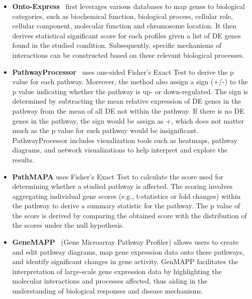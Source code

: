 \begin{itemize}
\item \textbf{Onto-Express}~\cite{Khatri:2002, DraghiciOE2:2003} first leverages various databases to map genes to biological categories, such as biochemical function, biological process, cellular role, cellular component, molecular function and chromosome location. It then derives statistical significant score for each profiles given a list of DE genes found in the studied condition. Subsequently, specific mechanisms of interactions can be constructed based on these relevant biological processes.

\item \textbf{PathwayProcessor}~\cite{Grosu:2002} uses one-sided Fisher's Exact Test to derive the p value for each pathway. Moreover, the method also assign a sign (+/-) to the p value indicating whether the pathway is up- or down-regulated. The sign is determined by subtracting the mean relative expression of DE genes in the pathway from the mean of all DE not within the pathway. If there is no DE genes in the pathway, the sign would be assign as +, which does not matter much as the p value for such pathway would be insignificant. PathwayProcessor includes visualization tools such as heatmaps, pathway diagrams, and network visualizations to help interpret and explore the results.

\item \textbf{PathMAPA} \cite{Pan:2003} uses Fisher's Exact Test to calculate the score used for determining whether a studied pathway is affected. The scoring  involves aggregating individual gene scores (e.g., t-statistics or fold changes) within the pathway to derive a summary statistic for the pathway. The p value of the score is derived by comparing the obtained score with the distribution of the scores under the null hypothesis. 


%
%

\item \textbf{GeneMAPP}~\cite{Dahlquist:2002} (Gene Microarray Pathway Profiler) allows users to create and edit pathway diagrams, map gene expression data onto these pathways, and identify significant changes in gene activity. GenMAPP facilitates the interpretation of large-scale gene expression data by highlighting the molecular interactions and processes affected, thus aiding in the understanding of biological responses and disease mechanisms.


\end{itemize}

